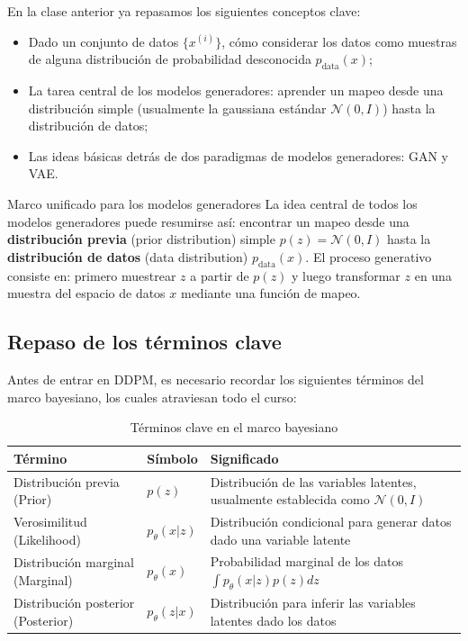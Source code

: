 \documentclass[a4paper]{article}
\begin{document}
En la clase anterior ya repasamos los siguientes conceptos clave:
\begin{itemize}
    \item Dado un conjunto de datos $\{x^{(i)}\}$, cómo considerar los datos como muestras de alguna distribución de probabilidad desconocida $p_{\text{data}}(x)$;
    \item La tarea central de los modelos generadores: aprender un mapeo desde una distribución simple (usualmente la gaussiana estándar $\mathcal{N}(0, I)$) hasta la distribución de datos;
    \item Las ideas básicas detrás de dos paradigmas de modelos generadores: GAN y VAE.
\end{itemize}

\begin{knowledgebox}{Marco unificado para los modelos generadores}
La idea central de todos los modelos generadores puede resumirse así: encontrar un mapeo desde una \textbf{distribución previa} (prior distribution) simple $p(z) = \mathcal{N}(0, I)$ hasta la \textbf{distribución de datos} (data distribution) $p_{\text{data}}(x)$. El proceso generativo consiste en: primero muestrear $z$ a partir de $p(z)$ y luego transformar $z$ en una muestra del espacio de datos $x$ mediante una función de mapeo.
\end{knowledgebox}

\subsection{Repaso de los términos clave}

Antes de entrar en DDPM, es necesario recordar los siguientes términos del marco bayesiano, los cuales atraviesan todo el curso:

\begin{table}[H]
\centering
\begin{tabular}{lll}
\toprule
\textbf{Término} & \textbf{Símbolo} & \textbf{Significado} \\
\midrule
Distribución previa (Prior) & $p(z)$ & Distribución de las variables latentes, usualmente establecida como $\mathcal{N}(0, I)$ \\
Verosimilitud (Likelihood) & $p_\theta(x|z)$ & Distribución condicional para generar datos dado una variable latente \\
Distribución marginal (Marginal) & $p_\theta(x)$ & Probabilidad marginal de los datos $\int p_\theta(x|z)p(z)dz$ \\
Distribución posterior (Posterior) & $p_\theta(z|x)$ & Distribución para inferir las variables latentes dado los datos \\
\bottomrule
\end{tabular}
\caption{Términos clave en el marco bayesiano}
\end{table}
\end{document}
